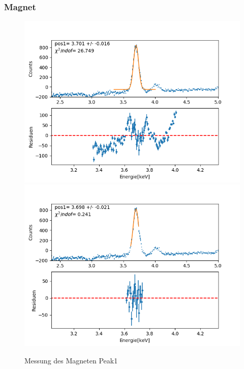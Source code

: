 \documentclass[12pt,a4paper]{article}
\begin{document}
\subsubsection{Magnet}
\begin{figure}[H]
\centering
\includegraphics[scale=0.49]{Bilder/roentgen_spektren/magnet/mag1_1.png}
\includegraphics[scale=0.49]{Bilder/roentgen_spektren/magnet/mag1_2.png}
\caption{Messung des Magneten Peak1}
\end{figure}
\end{document}
